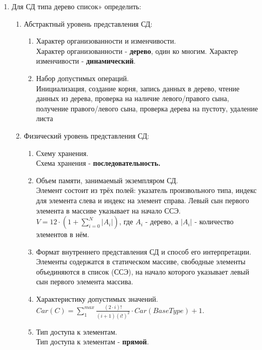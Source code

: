 \documentclass[a4paper,14pt]{extarticle}
\begin{document}
\begin{enumerate}
	\item Для СД типа дерево список» определить:
	      \begin{enumerate}[label*=\arabic*.]
		      \item Абстрактный уровень представления СД:

		            \begin{enumerate}[label*=\arabic*.]
			            \item Характер организованности и изменчивости.\\
			            Характер организованности - \textbf{дерево}, один ко многим. Характер изменчивости - \textbf{динамический}.
			            \item Набор допустимых операций.\\
			            Инициализация, создание корня, запись данных в дерево, 
                        чтение данных из дерева, проверка на наличие левого/правого сына,
                        получение правого/левого сына, проверка дерева на пустоту, 
                        удаление листа
		            \end{enumerate}

		      \item Физический уровень представления СД:

		            \begin{enumerate}[label*=\arabic*.]
			            \item Схему хранения.\\
			            Схема хранения - \textbf{последовательность.}
			            \item Объем памяти, занимаемый экземпляром СД.\\
			            Элемент состоит из трёх полей: указатель произвольного типа, 
                        индекс для элемента слева и индекс на элемент справа. 
                        Левый сын первого элемента в массиве указывает на начало ССЭ. \\
                        $V = 12 \cdot (1 + \sum_{i = 0}^{N}|A_i|)$, где $A_i$ - дерево, а $|A_i|$ - количество элементов в нём.
			            \item Формат внутреннего представления СД и способ его интерпретации.\\
			            Элементы содержатся в статическом массиве, свободные элементы объединяются
                        в список (ССЭ), на начало которого указывает левый сын первого элемента массива.
			            \item Характеристику допустимых значений.\\
			            $Car(C) = \sum_{1}^{max} \frac{(2 \cdot i)!}{(i + 1)(i!)^2} \cdot Car(BaseType) + 1$.
			            \item Тип доступа к элементам.\\
						Тип доступа к элементам - \textbf{прямой}.
		            \end{enumerate}


\end{enumerate}
\end{enumerate}
\end{document}
